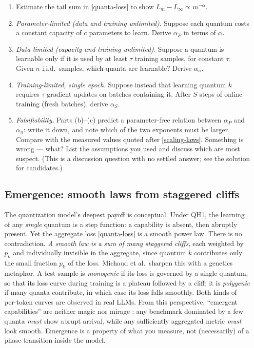 \documentclass[11pt]{article}
\begin{document}
\begin{exercise}
\label{ex:quanta}
\important
\begin{enumerate}
    \item Estimate the tail sum in \eqref{quanta-loss} to show $L_m - L_\infty \propto m^{-\alpha}$.
    \item \emph{Parameter-limited (data and training unlimited).} Suppose each quantum costs a constant capacity of $c$ parameters to learn. Derive $\alpha_P$ in terms of $\alpha$.
    \item \emph{Data-limited (capacity and training unlimited).} Suppose a quantum is learnable only if it is used by at least $\tau$ training samples, for constant $\tau$. Given $n$ i.i.d.\ samples, which quanta are learnable? Derive $\alpha_n$.
    \item \emph{Training-limited, single epoch.} Suppose instead that learning quantum $k$ requires $\tau$ gradient updates on batches containing it. After $S$ steps of online training (fresh batches), derive $\alpha_S$.
    \item \emph{Falsifiability.} Parts (b)--(c) predict a parameter-free relation between $\alpha_P$ and $\alpha_n$: write it down, and note which of the two exponents must be larger. Compare with the measured values quoted after \eqref{scaling-laws}. Something is wrong --- what? List the assumptions you used and discuss which are most suspect. (This is a discussion question with no settled answer; see the solution for candidates.)
\end{enumerate}
\end{exercise}


\subsection{Emergence: smooth laws from staggered cliffs}
\label{sec:emergence}

The quantization model's deepest payoff is conceptual. Under QH1, the learning of any \emph{single} quantum is a step function: a capability is absent, then abruptly present. Yet the aggregate loss \eqref{quanta-loss} is a smooth power law. There is no contradiction. \emph{A smooth law is a sum of many staggered cliffs}, each weighted by $p_k$ and individually invisible in the aggregate, since quantum $k$ contributes only the small fraction $p_k$ of the loss. Michaud et al.\ sharpen this with a genetics metaphor. A test sample is \emph{monogenic} if its loss is governed by a single quantum, so that its loss curve during training is a plateau followed by a cliff; it is \emph{polygenic} if many quanta contribute, in which case its loss falls smoothly. Both kinds of per-token curves are observed in real LLMs. From this perspective, ``emergent capabilities'' \cite{wei2022emergent} are neither magic nor mirage \cite{schaeffer2023emergent}: any benchmark dominated by a few quanta \emph{must} show abrupt arrival, while any sufficiently aggregated metric \emph{must} look smooth. Emergence is a property of what you measure, not (necessarily) of a phase transition inside the model.
\end{document}
